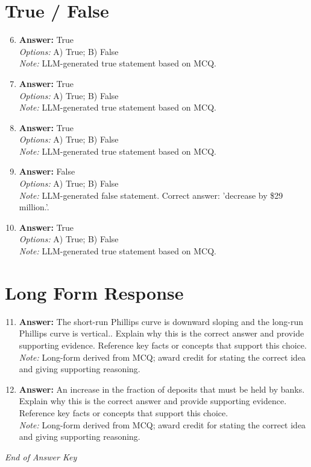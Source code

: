 \documentclass[12pt]{article}
\begin{document}
\section*{True / False}
\begin{enumerate}[label=\arabic*.]
\setcounter{enumi}{5}
\item \textbf{Answer:} True
\\ \textit{Options:} A) True; B) False
\\ \textit{Note:} LLM-generated true statement based on MCQ.
\item \textbf{Answer:} True
\\ \textit{Options:} A) True; B) False
\\ \textit{Note:} LLM-generated true statement based on MCQ.
\item \textbf{Answer:} True
\\ \textit{Options:} A) True; B) False
\\ \textit{Note:} LLM-generated true statement based on MCQ.
\item \textbf{Answer:} False
\\ \textit{Options:} A) True; B) False
\\ \textit{Note:} LLM-generated false statement. Correct answer: 'decrease by \$29 million.'.
\item \textbf{Answer:} True
\\ \textit{Options:} A) True; B) False
\\ \textit{Note:} LLM-generated true statement based on MCQ.
\end{enumerate}

\section*{Long Form Response}
\begin{enumerate}[label=\arabic*.]
\setcounter{enumi}{10}
\item \textbf{Answer:} The short-run Phillips curve is downward sloping and the long-run Phillips curve is vertical.. Explain why this is the correct answer and provide supporting evidence. Reference key facts or concepts that support this choice.
\\ \textit{Note:} Long-form derived from MCQ; award credit for stating the correct idea and giving supporting reasoning.
\item \textbf{Answer:} An increase in the fraction of deposits that must be held by banks. Explain why this is the correct answer and provide supporting evidence. Reference key facts or concepts that support this choice.
\\ \textit{Note:} Long-form derived from MCQ; award credit for stating the correct idea and giving supporting reasoning.
\end{enumerate}

\vfill
\noindent\textit{End of Answer Key}
\end{document}
